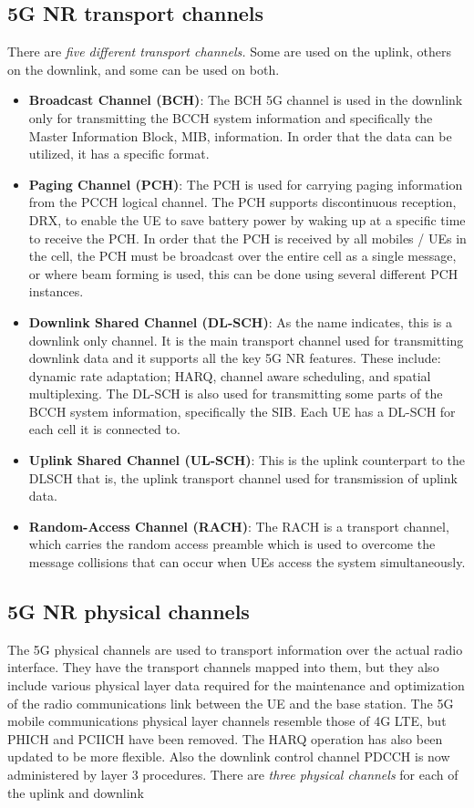 \subsection{5G NR transport channels}
There are \emph{five different transport channels.} Some are used on the uplink, others on the downlink, and some can be used on both.

\begin{itemize}
    \item \textbf{Broadcast Channel (BCH)}: The BCH 5G channel is used in the downlink only for transmitting the BCCH system information and specifically the Master Information Block, MIB, information. In order that the data can be utilized, it has a specific format.
    \item \textbf{Paging Channel (PCH)}: The PCH is used for carrying paging information from the PCCH logical channel. The PCH supports discontinuous reception, DRX, to enable the UE to save battery power by waking up at a specific time to receive the PCH.
    \newline
    In order that the PCH is received by all mobiles / UEs in the cell, the PCH must be broadcast over the entire cell as a single message, or where beam forming is used, this can be done using several different PCH instances.
    \item \textbf{Downlink Shared Channel (DL-SCH)}: As the name indicates, this is a downlink only channel. It is the main transport channel used for transmitting downlink data and it supports all the key 5G NR features. These include: dynamic rate adaptation; HARQ, channel aware scheduling, and spatial multiplexing.
    \newline
    The DL-SCH is also used for transmitting some parts of the BCCH system information, specifically the SIB. Each UE has a DL-SCH for each cell it is connected to.
    \item \textbf{Uplink Shared Channel (UL-SCH)}: This is the uplink counterpart to the DLSCH that is, the uplink transport channel used for transmission of uplink data.
    \item \textbf{Random-Access Channel (RACH)}: The RACH is a transport channel, which carries the random access preamble which is used to overcome the message collisions that can occur when UEs access the system simultaneously.
\end{itemize}

\subsection{5G NR physical channels}
The 5G physical channels are used to transport information over the actual radio interface. They have the transport channels mapped into them, but they also include various physical layer data required for the maintenance and optimization of the radio communications link between the UE and the base station.
The 5G mobile communications physical layer channels resemble those of 4G LTE, but PHICH and PCIICH have been removed. The HARQ operation has also been updated to be more flexible. Also the downlink control channel PDCCH is now administered by layer 3 procedures.
There are \emph{three physical channels} for each of the uplink and downlink

